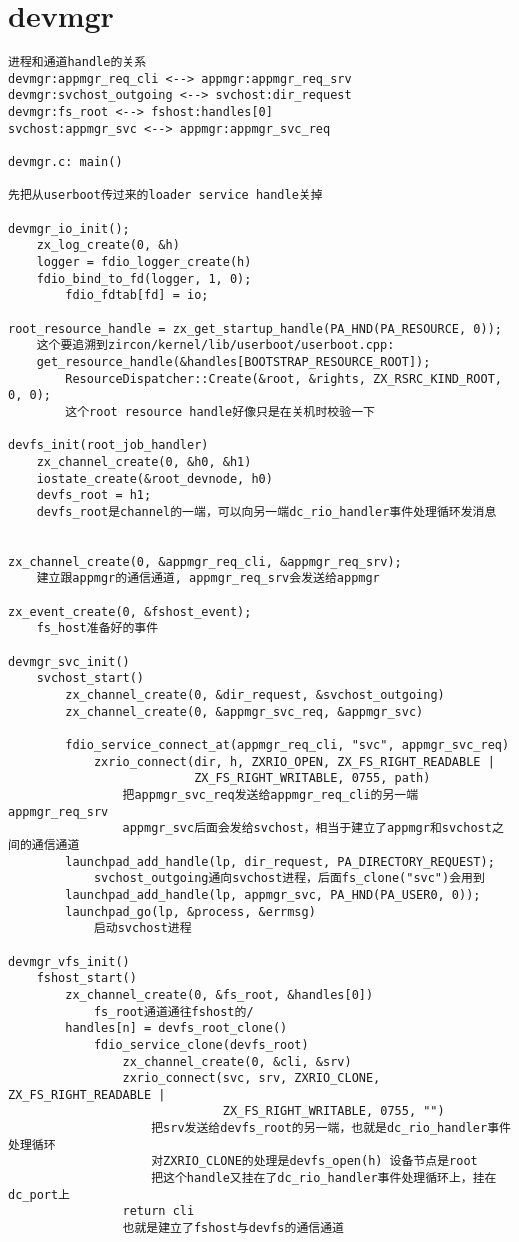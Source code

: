 \section{devmgr}

\begin{verbatim}
进程和通道handle的关系
devmgr:appmgr_req_cli <--> appmgr:appmgr_req_srv
devmgr:svchost_outgoing <--> svchost:dir_request
devmgr:fs_root <--> fshost:handles[0]
svchost:appmgr_svc <--> appmgr:appmgr_svc_req

devmgr.c: main()

先把从userboot传过来的loader service handle关掉

devmgr_io_init();
    zx_log_create(0, &h)
    logger = fdio_logger_create(h)
    fdio_bind_to_fd(logger, 1, 0);
        fdio_fdtab[fd] = io;

root_resource_handle = zx_get_startup_handle(PA_HND(PA_RESOURCE, 0));
    这个要追溯到zircon/kernel/lib/userboot/userboot.cpp:
    get_resource_handle(&handles[BOOTSTRAP_RESOURCE_ROOT]);
        ResourceDispatcher::Create(&root, &rights, ZX_RSRC_KIND_ROOT, 0, 0);
        这个root resource handle好像只是在关机时校验一下

devfs_init(root_job_handler)
    zx_channel_create(0, &h0, &h1)
    iostate_create(&root_devnode, h0)
    devfs_root = h1;
    devfs_root是channel的一端，可以向另一端dc_rio_handler事件处理循环发消息


zx_channel_create(0, &appmgr_req_cli, &appmgr_req_srv);
    建立跟appmgr的通信通道, appmgr_req_srv会发送给appmgr

zx_event_create(0, &fshost_event);
    fs_host准备好的事件

devmgr_svc_init()
    svchost_start()
        zx_channel_create(0, &dir_request, &svchost_outgoing)
        zx_channel_create(0, &appmgr_svc_req, &appmgr_svc)

        fdio_service_connect_at(appmgr_req_cli, "svc", appmgr_svc_req)
            zxrio_connect(dir, h, ZXRIO_OPEN, ZX_FS_RIGHT_READABLE |
                          ZX_FS_RIGHT_WRITABLE, 0755, path)
                把appmgr_svc_req发送给appmgr_req_cli的另一端appmgr_req_srv
                appmgr_svc后面会发给svchost，相当于建立了appmgr和svchost之间的通信通道
        launchpad_add_handle(lp, dir_request, PA_DIRECTORY_REQUEST);
            svchost_outgoing通向svchost进程，后面fs_clone("svc")会用到
        launchpad_add_handle(lp, appmgr_svc, PA_HND(PA_USER0, 0));
        launchpad_go(lp, &process, &errmsg)
            启动svchost进程

devmgr_vfs_init()
    fshost_start()
        zx_channel_create(0, &fs_root, &handles[0])
            fs_root通道通往fshost的/
        handles[n] = devfs_root_clone()
            fdio_service_clone(devfs_root)
                zx_channel_create(0, &cli, &srv)
                zxrio_connect(svc, srv, ZXRIO_CLONE, ZX_FS_RIGHT_READABLE |
                              ZX_FS_RIGHT_WRITABLE, 0755, "")
                    把srv发送给devfs_root的另一端，也就是dc_rio_handler事件处理循环
                    对ZXRIO_CLONE的处理是devfs_open(h) 设备节点是root
                    把这个handle又挂在了dc_rio_handler事件处理循环上，挂在dc_port上
                return cli
                也就是建立了fshost与devfs的通信通道


\end{verbatim}
